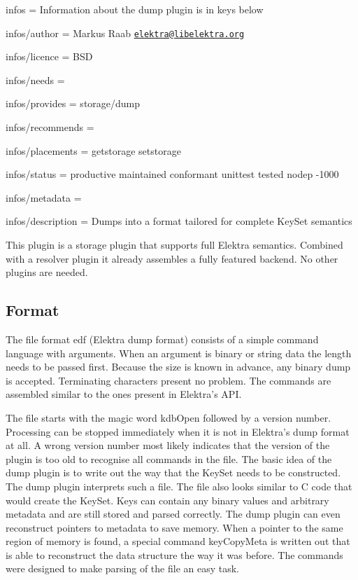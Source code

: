 
\begin{DoxyItemize}
\item infos = Information about the dump plugin is in keys below
\item infos/author = Markus Raab \href{mailto:elektra@libelektra.org}{\tt elektra@libelektra.\+org}
\item infos/licence = B\+SD
\item infos/needs =
\item infos/provides = storage/dump
\item infos/recommends =
\item infos/placements = getstorage setstorage
\item infos/status = productive maintained conformant unittest tested nodep -\/1000
\item infos/metadata =
\item infos/description = Dumps into a format tailored for complete Key\+Set semantics
\end{DoxyItemize}

This plugin is a storage plugin that supports full Elektra semantics. Combined with a resolver plugin it already assembles a fully featured backend. No other plugins are needed.

\subsection*{Format}

The file format edf (Elektra dump format) consists of a simple command language with arguments. When an argument is binary or string data the length needs to be passed first. Because the size is known in advance, any binary dump is accepted. Terminating characters present no problem. The commands are assembled similar to the ones present in Elektra’s A\+PI.

The file starts with the magic word {\ttfamily kdb\+Open} followed by a version number. Processing can be stopped immediately when it is not in Elektra’s dump format at all. A wrong version number most likely indicates that the version of the plugin is too old to recognise all commands in the file. The basic idea of the dump plugin is to write out the way that the Key\+Set needs to be constructed. The dump plugin interprets such a file. The file also looks similar to C code that would create the Key\+Set. Keys can contain any binary values and arbitrary metadata and are still stored and parsed correctly. The dump plugin can even reconstruct pointers to metadata to save memory. When a pointer to the same region of memory is found, a special command {\ttfamily key\+Copy\+Meta} is written out that is able to reconstruct the data structure the way it was before. The commands were designed to make parsing of the file an easy task.

